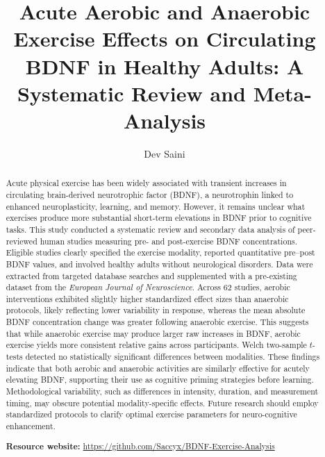 \documentclass[runningheads]{llncs}
\begin{document}
\title{Acute Aerobic and Anaerobic Exercise Effects on Circulating BDNF in Healthy Adults: A Systematic Review and Meta-Analysis}
\author{Dev Saini}
%
\maketitle              
%
\begin{abstract}
Acute physical exercise has been widely associated with transient increases in circulating brain-derived neurotrophic factor (BDNF), a neurotrophin linked to enhanced neuroplasticity, learning, and memory. However, it remains unclear what exercises produce more substantial short-term elevations in BDNF prior to cognitive tasks. This study conducted a systematic review and secondary data analysis of peer-reviewed human studies measuring pre- and post-exercise BDNF concentrations. Eligible studies clearly specified the exercise modality, reported quantitative pre–post BDNF values, and involved healthy adults without neurological disorders. Data were extracted from targeted database searches and supplemented with a pre-existing dataset from the \textit{European Journal of Neuroscience}. Across 62 studies, aerobic interventions exhibited slightly higher standardized effect sizes than anaerobic protocols, likely reflecting lower variability in response, whereas the mean absolute BDNF concentration change was greater following anaerobic exercise. This suggests that while anaerobic exercise may produce larger raw increases in BDNF, aerobic exercise yields more consistent relative gains across participants. Welch two-sample $t$-tests detected no statistically significant differences between modalities. These findings indicate that both aerobic and anaerobic activities are similarly effective for acutely elevating BDNF, supporting their use as cognitive priming strategies before learning. Methodological variability, such as differences in intensity, duration, and measurement timing, may obscure potential modality-specific effects. Future research should employ standardized protocols to clarify optimal exercise parameters for neuro-cognitive enhancement.

\noindent\textbf{Resource website:} \url{https://github.com/Saccyx/BDNF-Exercise-Analysis}

\end{abstract}
\end{document}
